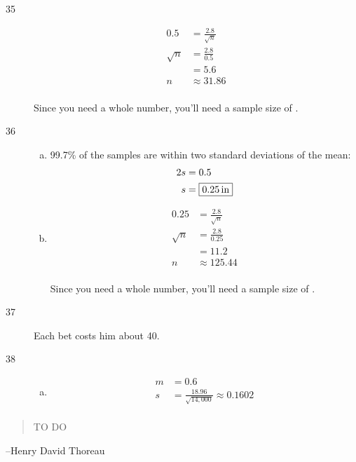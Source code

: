 \documentclass[letterpaper, landscape]{exam}
\newcommand{\cent}{\textcent\xspace}
\begin{document}
\begin{description}
      \item[35]
        \begin{align*}
          0.5      & = \frac{2.8}{\sqrt{n}} \\
          \sqrt{n} & = \frac{2.8}{0.5} \\
                   & = 5.6 \\
          n        & \approx 31.86 \\
        \end{align*}

        Since you need a whole number, you'll need a sample size of 
        .

      \item[36]
        \begin{enumerate}[(a)]
          \item 99.7\% of the samples are within two standard deviations of the
            mean:
            \begin{align*}
              2s & = 0.5 \\
              s  & = \boxed{ \unit[0.25]{in} } \\
            \end{align*}

          \item 
            \begin{align*}
              0.25      & = \frac{2.8}{\sqrt{n}} \\
              \sqrt{n} & = \frac{2.8}{0.25} \\
                       & = 11.2 \\
              n        & \approx 125.44 \\
            \end{align*}

            Since you need a whole number, you'll need a sample size of 
            .
        \end{enumerate}

      \item[37] Each bet costs him about 40\cent.

      \item[38]
        \begin{enumerate}[(a)]
          \item 
            \begin{align*}
              m &= \boxed{ 0.6 } \\
              s &= \frac{18.96}{\sqrt{14,000}} \approx \boxed{ 0.1602 } \\
            \end{align*}
            
        \end{enumerate}

  \end{description}

  \else
    \vspace{10 cm}
    \begin{quote}
      \begin{em}
        TO DO
      \end{em}
    \end{quote}
    \hspace{1 cm} --Henry David Thoreau
  \fi
\end{document}
